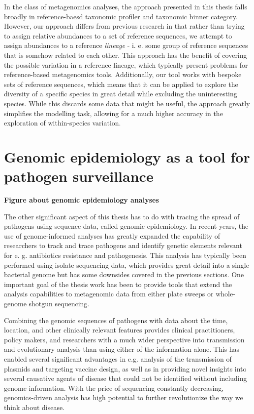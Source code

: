 \documentclass[officiallayout]{tktla}
\begin{document}
In the class of metagenomics analyses, the approach presented in this
thesis falls broadly in reference-baesd taxonomic profiler and
taxonomic binner category. However, our approach differs from previous
research in that rather than trying to assign relative abundances to a
set of reference sequences, we attempt to assign abundances to a
reference \textit{lineage} - i. e. some group of reference sequences
that is somehow related to each other. This approach has the benefit
of covering the possible variation in a reference lineage, which
typically present problems for reference-based metagenomics
tools. Additionally, our tool works with bespoke sets of reference
sequences, which means that it can be applied to explore the diversity
of a specific species in great detail while excluding the
uninteresting species. While this discards some data that might be
useful, the approach greatly simplifies the modelling task, allowing
for a much higher accuracy in the exploration of within-species
variation.

\section{Genomic epidemiology as a tool for pathogen surveillance}

\textbf{Figure about genomic epidemiology analyses}

The other significant aspect of this thesis has to do with tracing the
spread of pathogens using sequence data, called genomic
epidemiology. In recent years, the use of genome-informed analyses has
greatly expanded the capability of researchers to track and trace
pathogens and identify genetic elements relevant for e. g. antibiotics
resistance and pathogenesis. This analysis has typically been
performed using isolate sequencing data, which provides great detail
into a single bacterial genome but has some downsides covered in the
previous sections. One important goal of the thesis work has been to
provide tools that extend the analysis capabilities to metagenomic
data from either plate sweeps or whole-genome shotgun sequencing.

Combining the genomic sequences of pathogens with data about the time,
location, and other clinically relevant features provides clinical
practitioners, policy makers, and researchers with a much wider
perspective into transmission and evolutionary analysis than using
either of the information alone. This has enabled several significant
advantages in e.g. analysis of the transmission of plasmids and
targeting vaccine design, as well as in providing novel insights into
several causative agents of disease that could not be identified
without including genome information. With the price of sequencing
constantly decreasing, genomics-driven analysis has high potential to
further revolutionize the way we think about disease.
\end{document}
